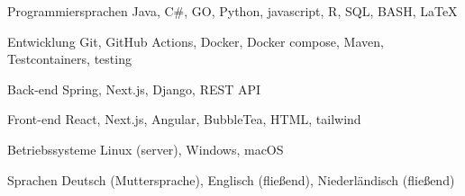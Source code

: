 
\begin{cvskills}
  
    \cvskill
      {Programmiersprachen} %
      {Java, C\#, GO, Python, javascript, R, SQL, BASH, LaTeX} %

  \cvskill
    {Entwicklung} %
    {Git, GitHub Actions, Docker, Docker compose, Maven, Testcontainers, testing} %

  \cvskill
    {Back-end} %
    {Spring, Next.js, Django, REST API} %

  \cvskill
    {Front-end} %
    {React, Next.js, Angular, BubbleTea, HTML, tailwind} %

  \cvskill
  {Betriebssysteme} %
  {Linux (server), Windows, macOS} %

  \cvskill
    {Sprachen} %
    {Deutsch (Muttersprache), Englisch (fließend), Niederländisch (fließend)} %

\end{cvskills}
